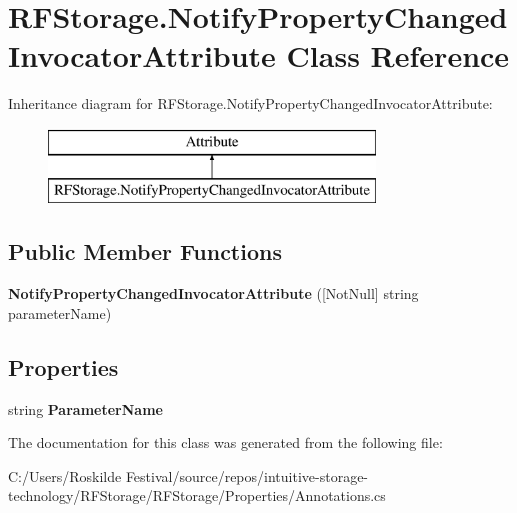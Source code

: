 \hypertarget{class_r_f_storage_1_1_notify_property_changed_invocator_attribute}{}\section{R\+F\+Storage.\+Notify\+Property\+Changed\+Invocator\+Attribute Class Reference}
\label{class_r_f_storage_1_1_notify_property_changed_invocator_attribute}
Inheritance diagram for R\+F\+Storage.\+Notify\+Property\+Changed\+Invocator\+Attribute\+:\begin{figure}[H]
\begin{center}
\leavevmode
\includegraphics[height=2.000000cm]{class_r_f_storage_1_1_notify_property_changed_invocator_attribute}
\end{center}
\end{figure}
\subsection*{Public Member Functions}
\begin{DoxyCompactItemize}
\item 
\mbox{\label{class_r_f_storage_1_1_notify_property_changed_invocator_attribute_ab6d50cfc50af809fa9eaaccece602bd9}} 
{\bfseries Notify\+Property\+Changed\+Invocator\+Attribute} (\mbox{[}Not\+Null\mbox{]} string parameter\+Name)
\end{DoxyCompactItemize}
\subsection*{Properties}
\begin{DoxyCompactItemize}
\item 
\mbox{\label{class_r_f_storage_1_1_notify_property_changed_invocator_attribute_a701794c4d67e925207809a976faf596c}} 
string {\bfseries Parameter\+Name}
\end{DoxyCompactItemize}


The documentation for this class was generated from the following file\+:\begin{DoxyCompactItemize}
\item 
C\+:/\+Users/\+Roskilde Festival/source/repos/intuitive-\/storage-\/technology/\+R\+F\+Storage/\+R\+F\+Storage/\+Properties/Annotations.\+cs\end{DoxyCompactItemize}
